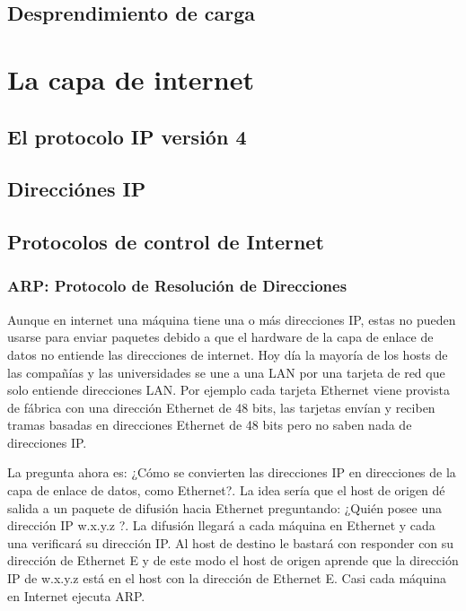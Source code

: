 \documentclass[10pt,a4paper]{report}
\begin{document}
\subsection{Desprendimiento de carga}

\section{La capa de internet}
	\subsection{El protocolo IP versión 4}
	\subsection{Direcciónes IP}


\subsection{Protocolos de control de Internet}

\subsubsection{ARP: Protocolo de Resolución de Direcciones}

	\par Aunque en internet una máquina tiene una o más direcciones IP, estas no pueden usarse para enviar paquetes debido a que el hardware de la capa de enlace de datos no entiende las direcciones de internet. Hoy día la mayoría de los hosts de las compañías y las universidades se une a una LAN por una tarjeta de red que solo entiende direcciones LAN. Por ejemplo cada tarjeta Ethernet viene provista de fábrica con una dirección Ethernet de 48 bits, las tarjetas envían y reciben tramas basadas en direcciones Ethernet de 48 bits pero no saben nada de direcciones IP.
	
	\par La pregunta ahora es: ¿Cómo se convierten las direcciones IP en direcciones de la capa de enlace de datos, como Ethernet?. La idea sería que el host de origen dé salida a un paquete de difusión hacia Ethernet preguntando: ¿Quién posee una dirección IP w.x.y.z ?. La difusión llegará a cada máquina en Ethernet y cada una verificará su dirección IP. Al host de destino le bastará con responder con su dirección de Ethernet E y de este modo el host de origen aprende que la dirección IP de w.x.y.z está en el host con la dirección de Ethernet E. Casi cada máquina en Internet ejecuta ARP.
\end{document}
